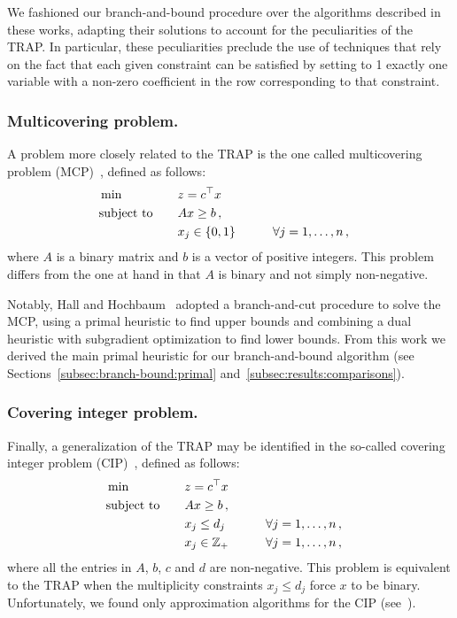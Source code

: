 \documentclass[runningheads]{llncs}
\begin{document}
We fashioned our branch-and-bound procedure over the algorithms described in these works, adapting their solutions to account for the peculiarities of the TRAP. In particular, these peculiarities preclude the use of techniques that rely on the fact that each given constraint can be satisfied by setting to 1 exactly one variable with a non-zero coefficient in the row corresponding to that constraint.

\subsubsection{Multicovering problem.} A problem more closely related to the TRAP is the one called multicovering problem (MCP)~\cite{hall-hochbaum-1986-fast-approximation, hall-hochbaum-1992-multicovering}, defined as follows:
\begin{alignat}{3}
  &\min & \quad & z = c^\top x \notag\\
  &\text{subject to}  &       & Ax \ge b \, , \notag\\
  &                   &       & x_j \in \{0, 1\}  & \qquad & \forall j=1,\dots,n \, , \notag
\end{alignat}
where $A$ is a binary matrix and $b$ is a vector of positive integers. This problem differs from the one at hand in that $A$ is binary and not simply non-negative.

Notably, Hall and Hochbaum~\cite{hall-hochbaum-1992-multicovering} adopted a branch-and-cut procedure to solve the MCP, using a primal heuristic to find upper bounds and combining a dual heuristic with subgradient optimization to find lower bounds. From this work we derived the main primal heuristic for our branch-and-bound algorithm (see Sections~\ref{subsec:branch-bound:primal} and~\ref{subsec:results:comparisons}). 

\subsubsection{Covering integer problem.} Finally, a generalization of the TRAP may be identified in the so-called covering integer problem (CIP)~\cite{kolliopoulos-2003-approximating,kolliopoulos-2005-approximation}, defined as follows:
\begin{alignat}{3}
  &\min & \quad & z = c^\top x \notag\\
  &\text{subject to}  &       & Ax \ge b \, , \notag\\
  &                   &       & x_j \le d_j & \qquad & \forall j=1,\dots,n \, , \notag\\
  &                   &       & x_j \in \mathbb{Z}_{+}  & \qquad &  \forall j=1,\dots,n \, , \notag
\end{alignat}
where all the entries in $A$, $b$, $c$ and $d$ are non-negative. This problem is equivalent to the TRAP when the multiplicity constraints $x_j \le d_j$ force $x$ to be binary. Unfortunately, we found only approximation algorithms for the CIP (see~\cite{kolliopoulos-2003-approximating,kolliopoulos-2005-approximation}).
\end{document}

